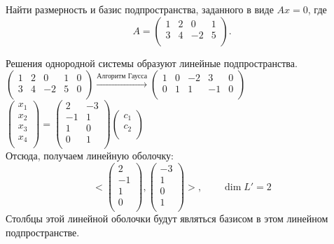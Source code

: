 \begin{prim}
	Найти размерность и базис подпространства, заданного в виде $Ax=0$, где
	$$
	A = 
	\begin{pmatrix}
	1 & 2 & 0 & 1\\
	3 & 4 & -2 & 5\\
	\end{pmatrix}.
	$$
\end{prim}
Решения однородной системы образуют линейные подпространства.\\
$
\left(
\begin{array}{cccc|c}
1 & 2 & 0 & 1 & 0\\
3 & 4 & -2 & 5 & 0\\
\end{array}
\right)
\xrightarrow{\text{Алгоритм Гаусса}}
\left(
\begin{array}{cccc|c}
1 & 0 & -2 & 3 & 0\\
0 & 1 & 1 & -1 & 0\\
\end{array}
\right)
$\\
$
\begin{pmatrix}
x_1\\
x_2\\
x_3\\
x_4\\
\end{pmatrix}
=
\begin{pmatrix}
2 & -3\\
-1 & 1\\
1 & 0\\
0 & 1\\
\end{pmatrix}
\begin{pmatrix}
c_1\\
c_2\\
\end{pmatrix}
$\\
Отсюда, получаем линейную оболочку:
$$
<
\begin{pmatrix}
2\\
-1\\
1\\
0\\
\end{pmatrix}
,
\begin{pmatrix}
-3\\
1\\
0\\
1\\
\end{pmatrix}
>
, \qquad \dim L' = 2
$$
Столбцы этой линейной оболочки будут являться базисом в этом линейном подпространстве.

